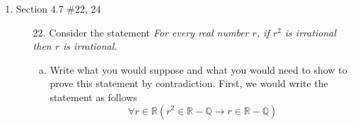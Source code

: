 \documentclass[12pt]{article}
\newcommand{\Z}{\mathbb{Z}}
\newcommand{\R}{\mathbb{R}}
\newcommand{\Q}{\mathbb{Q}}
\newcommand{\paren}[1]{\left( #1 \right)}
\newcommand{\zero}{\{0\}}
\newcommand{\then}{\rightarrow}
\begin{document}
\begin{enumerate}
\begin{enumerate}
\begin{enumerate}[a.]
\begin{proof}[proof]
                        
                        \end{proof}
                            

                \end{enumerate}

            \newpage
            \item[18.] If $a,b \in \Q$, $b \neq 0$, and $r \in \R - \Q$, then $a+br \in \R - \Q$.
                \[
                \forall a \in \Q \; \forall b \in \Q - \zero \; \forall r \in \R - \Q \paren{
                a+br \in \R - \Q
                }
                \]
                \begin{proof}
                    suppose for some $a \in \Q$, for some $b \in \Q - \zero$, and for some $ r\in \R - \Q$, that $a+br \in \Q$, then by definition, for some $m_1,m_3 \in \Z$, $n_1,n_2,n_3,m_2 \in \Z - \zero$
                    \[
                    a = \frac{m_1}{n_1} \quad b = \frac{m_2}{n_2} \quad a+br = \frac{m_3}{n_3}
                    \]
                    by algebra, we can express $r$ as
                    \[
                    r = \frac{1}{b}\paren{\frac{m_3}{n_3} - a}
                    \]
                    by substitution, we have
                    \[
                    r = \frac{n_2}{m_2}\paren{\frac{m_3}{n_3} - \frac{m_1}{n_1}}
                    \]
                    by algebra, we have
                    \[
                    r = \frac{n_2}{m_2}\cdot \frac{m_3n_1 - m_1n_3}{n_1n_3} = \frac{m_3n_1n_2 - m_1n_3n_2}{n_1n_2n_3}
                    \]
                    We see that $m_3n_1n_2 - m_1n_3n_2 \in \Z$ and $n_1n_2n_3 \in \Z - \zero$, therefore $r \in \Q$, which contradicts with the assumption $r \in \R - \Q$, therefore we proved the statement by contradiction. 
                \end{proof}
        \end{enumerate}
    \newpage
    \item Section 4.7 \#22, 24
        \begin{enumerate}
            \item[22.] Consider the statement \textit{For every real number $r$, if $r^2$ is irrational then $r$ is irrational.}
                \begin{enumerate}[a.]
                    \item Write what you would suppose and what you would need to show to prove this statement by contradiction.
                    First, we would write the statement as follows
                    \[
                    \forall r \in \R \paren{r^2 \in \R - \Q \then r \in \R - \Q}
\]
\end{enumerate}
\end{enumerate}
\end{enumerate}
\end{document}
